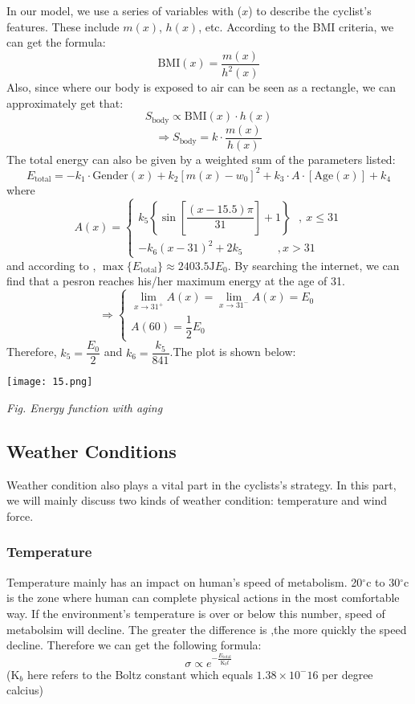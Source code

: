 \documentclass[14pt]{article}
\theoremstyle{definition}
\theoremstyle{remark}
\numberwithin{equation}{section}
\begin{document}
			In our model, we use a series of variables with (\(x\)) to describe the cyclist's features. These include $m( x )$, $ h ( x )$, etc. According to the BMI criteria, we can get the formula:
			$$\mathrm{BMI}( x )=\dfrac{m( x )}{ h ^2( x )}$$
			Also, since where our body is exposed to air can be seen as a rectangle, we can approximately get that:
			\[S_{\mathrm{body}} \propto \mathrm{BMI}(x)\cdot h(x)\]
			\[\Rightarrow S_{\mathrm{body}}=k\cdot \dfrac{m(x)}{h(x)}\]
			The total energy can also be given by a weighted sum of the parameters listed:
			\[E_{\mathrm{total}}=-k_1\cdot\mathrm{Gender}(x)+k_2[m(x)-w_0]^2+k_3\cdot A\cdot [\mathrm{Age}(x)]+k_4\]
			where
			\[A(x)=
				\begin{cases}
					k_5\left\{\sin\left[\dfrac{(x-15.5)\pi}{31 }\right]+1\right\}~~~,~x\leq 31 \\
					-k_6 (x-31)^2+2k_5~~~~~~~~~~~~~~,x>31
				\end{cases}
			\]
			and according to \cite{114514}, \(\max\{E_{\mathrm{total}}\}\approx 2403.5 \mathrm{J} E_{0}\). By searching the internet, we can find that a pesron reaches his/her maximum energy at the age of 31.
			\[
				\Rightarrow
				\begin{cases}
					\lim\limits_{x\rightarrow 31^+} A\left( x \right) =\lim\limits_{x\rightarrow 31^-} A\left( x \right)=E_0 \\
					A(60)=\dfrac 12 E_0
				\end{cases}
			\]
			Therefore, \(k_5 = \dfrac{E_0}{2}\) and \(k_6=\dfrac{k_5}{841}\).The plot is shown below:
			\begin{center}
				\texttt{[image: 15.png]}

				\small\textit{Fig. Energy function with aging}
			\end{center}
	\subsection{Weather Conditions}
	Weather condition also plays a vital part in the cyclists's strategy. In this part, we will mainly discuss two kinds of weather condition: temperature and wind force.
	\subsubsection{Temperature}
	Temperature mainly has an impact on human's speed of metabolism. 20$^{\circ}\mathrm{c}$ to 30$^{\circ}\mathrm{c}$ is the zone where human can complete physical actions in the most comfortable way. If the environment's temperature is over or below this number, speed of metabolsim will decline. The greater the difference is ,the more quickly the speed decline. Therefore we can get the following formula:
	$$ \sigma\propto e^{-\frac{ E _\mathrm{total}}{\mathrm{K}_ b t}}$$
	($\mathrm{K}_ b $ here refers to the Boltz constant which equals $1.38\times10^-16$ per degree calcius)
\end{document}

